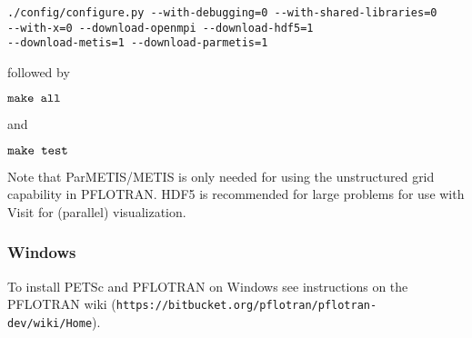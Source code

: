\begin{verbatim}
./config/configure.py --with-debugging=0 --with-shared-libraries=0 
--with-x=0 --download-openmpi --download-hdf5=1 
--download-metis=1 --download-parmetis=1
\end{verbatim}

\noindent
followed by

$\verb|make all|$

\noindent
and

$\verb|make test|$

Note that ParMETIS/METIS is only needed for using the unstructured grid capability in PFLOTRAN. HDF5 is recommended for large problems for use with Visit for (parallel) visualization.

\subsubsection{Windows}

To install PETSc and PFLOTRAN on Windows see instructions on the PFLOTRAN wiki \linebreak ({\tt https://bitbucket.org/pflotran/pflotran-dev/wiki/Home}).


